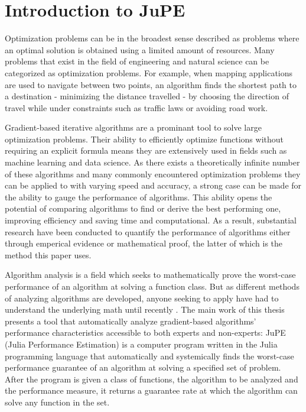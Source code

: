 \chapter{Introduction to JuPE}

Optimization problems can be in the broadest sense described as problems where an optimal solution is obtained using a limited amount of resources. Many problems that exist in the field of engineering and natural science can be categorized as optimization problems. For example, when mapping applications are used to navigate between two points, an algorithm finds the shortest path to a destination - minimizing the distance travelled - by choosing the direction of travel while under constraints such as traffic laws or avoiding road work.

Gradient-based iterative algorithms are a prominant tool to solve large optimization problems. Their ability to efficiently optimize functions without requiring an explicit formula means they are extensively used in fields such as machine learning and data science. As there exists a theoretically infinite number of these algorithms and many commonly encountered optimization problems they can be applied to with varying speed and accuracy, a strong case can be made for the ability to gauge the performance of algorithms. This ability opens the potential of comparing algorithms to find or derive the best performing one, improving efficiency and saving time and computational. As a result, substantial research have been conducted to quantify the performance of algorithms either through emperical evidence or mathematical proof, the latter of which is the method this paper uses.

Algorithm analysis is a field which seeks to mathematically prove the worst-case performance of an algorithm at solving a function class. But as different methods of analyzing algorithms are developed, anyone seeking to apply have had to understand the underlying math until recently \cite{pepit}. The main work of this thesis presents a tool that automatically analyze gradient-based algorithms' performance characteristics accessible to both experts and non-experts: JuPE (Julia Performance Estimation) is a computer program written in the Julia programming language that automatically and systemically finds the worst-case performance guarantee of an algorithm at solving a specified set of problem. After the program is given a class of functions, the algorithm to be analyzed and the performance measure, it returns a guarantee rate at which the algorithm can solve any function in the set.

